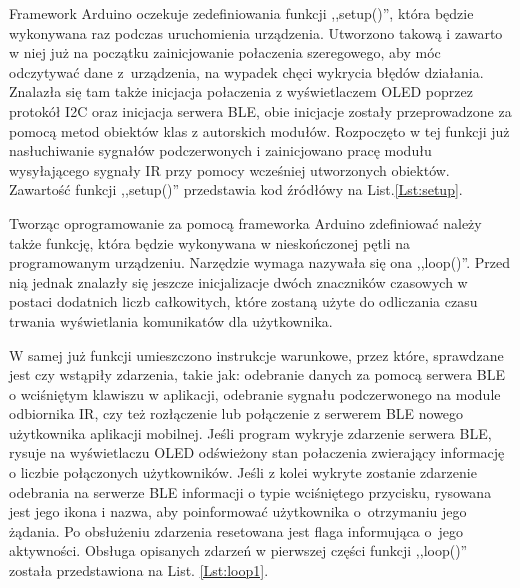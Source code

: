 \documentclass[12pt,twoside]{article}
\begin{document}


Framework Arduino oczekuje zedefiniowania funkcji ,,setup()'', która będzie wykonywana raz podczas uruchomienia urządzenia. Utworzono takową i zawarto w niej już na początku zainicjowanie połaczenia szeregowego, aby móc odczytywać dane z~urządzenia, na wypadek chęci wykrycia błędów działania. Znalazła się tam także inicjacja połaczenia z wyświetlaczem OLED poprzez protokół I2C oraz inicjacja serwera BLE, obie inicjacje zostały przeprowadzone za pomocą metod obiektów klas z autorskich modułów. Rozpoczęto w tej funkcji już nasłuchiwanie sygnałów podczerwonych i zainicjowano pracę modułu wysyłającego sygnały IR przy pomocy wcześniej utworzonych obiektów. Zawartość funkcji ,,setup()'' przedstawia kod źródłówy na List.\ref*{Lst:setup}.



Tworząc oprogramowanie za pomocą frameworka Arduino zdefiniować należy także funkcję, która będzie wykonywana w nieskończonej pętli na programowanym urządzeniu. Narzędzie wymaga nazywała się ona ,,loop()''. Przed nią jednak znalazły się jeszcze inicjalizacje dwóch znaczników czasowych w postaci dodatnich liczb całkowitych, które zostaną użyte do odliczania czasu trwania wyświetlania komunikatów dla użytkownika.

W samej już funkcji umieszczono instrukcje warunkowe, przez które, sprawdzane jest czy wstąpiły zdarzenia, takie jak: odebranie danych za pomocą serwera BLE o wciśniętym klawiszu w aplikacji, odebranie sygnału podczerwonego na module odbiornika IR, czy też rozłączenie lub połączenie z serwerem BLE nowego użytkownika aplikacji mobilnej. Jeśli program wykryje zdarzenie serwera BLE, rysuje na wyświetlaczu OLED odświeżony stan połaczenia zwierający informację o liczbie połączonych użytkowników. Jeśli z kolei wykryte zostanie zdarzenie odebrania na serwerze BLE informacji o typie wciśniętego przycisku, rysowana jest jego ikona i nazwa, aby poinformować użytkownika o~otrzymaniu jego żądania. Po obsłużeniu zdarzenia resetowana jest flaga informująca o~jego aktywności. Obsługa opisanych zdarzeń w pierwszej części funkcji ,,loop()'' została przedstawiona na List. \ref*{Lst:loop1}.

\end{document}
